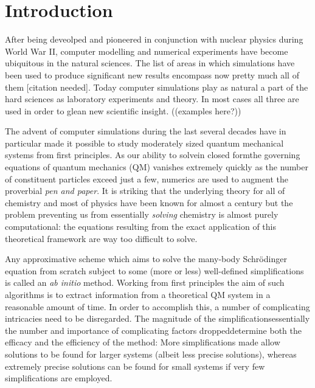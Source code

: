 \documentclass[twoside,english]{uiofysmaster}
\begin{document}
\tableofcontents

\chapter{Introduction}
After being deveolped and pioneered in conjunction with nuclear physics during World War II, computer modelling and numerical experiments have become ubiquitous in the natural sciences. The list of areas in which simulations have been used to produce significant new results encompass now pretty much all of them [citation needed]. Today computer simulations play as natural a part of the hard sciences as laboratory experiments and theory. In most cases all three are used in order to glean new scientific insight. ((examples here?))

The advent of computer simulations during the last several decades have in particular made it possible to study moderately sized quantum mechanical systems from first principles. As our ability to solve\textemdash in closed form\textemdash the governing equations of quantum mechanics (QM) vanishes extremely quickly as the number of constituent particles exceed just a few, numerics are used to augment the proverbial \emph{pen and paper}. It is striking that the underlying theory for all of chemistry and most of physics have been known for almost a century but the problem preventing us from essentially \emph{solving} chemistry is almost purely computational: the equations resulting from the exact application of this theoretical framework are way too difficult to solve.

Any approximative scheme which aims to solve the many-body Schrödinger equation from scratch subject to some (more or less) well-defined simplifications is called an \emph{ab initio} method. Working from first principles the aim of such algorithms is to extract information from a theoretical QM system in a reasonable amount of time. In order to accomplish this, a number of complicating intricacies need to be disregarded. The magnitude of the simplifications\textemdash essentially the number and importance of complicating factors dropped\textemdash determine both the efficacy and the efficiency of the method: More simplifications made allow solutions to be found for larger systems (albeit less precise solutions), whereas extremely precise solutions can be found for small systems if very few simplifications are employed.
\end{document}
